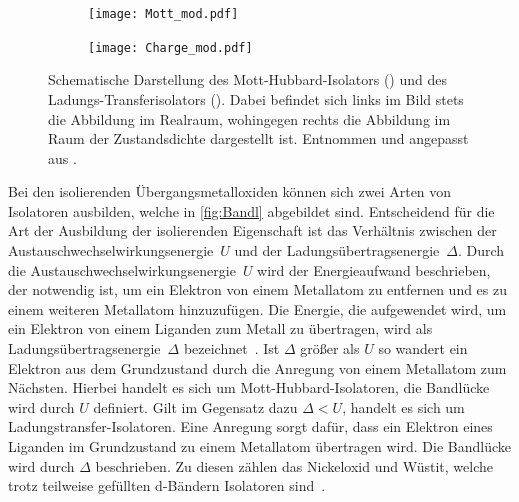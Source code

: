         \begin{figure}
            \centering
            \begin{subfigure}{0.48\textwidth}
                \centering
                \texttt{[image: Mott\_mod.pdf]}
                \subcaption{}
                \label{fig:Mott}
            \end{subfigure}
            \begin{subfigure}{0.48\textwidth}
                \centering
                \texttt{[image: Charge\_mod.pdf]}
                \subcaption{}
                \label{fig:Charge}
            \end{subfigure}
            \caption{Schematische Darstellung des Mott-Hubbard-Isolators () und des Ladungs-Transferisolators ().
            Dabei befindet sich links im Bild stets die Abbildung im Realraum, wohingegen rechts die Abbildung im Raum der Zustandsdichte dargestellt ist.
            Entnommen und angepasst aus \cite{stohr_magnetism_2006}.}
            \label{fig:Bandl}
        \end{figure}
        Bei den isolierenden Übergangsmetalloxiden können sich zwei Arten von Isolatoren ausbilden, welche in \autoref{fig:Bandl} abgebildet sind.
        Entscheidend für die Art der Ausbildung der isolierenden Eigenschaft ist das Verhältnis zwischen der Austauschwechselwirkungsenergie~$U$ und der Ladungsübertragsenergie~$\Delta$.
        Durch die Austauschwechselwirkungsenergie~$U$ wird der Energieaufwand beschrieben, der notwendig ist, um ein Elektron von einem Metallatom zu entfernen und es zu einem weiteren Metallatom hinzuzufügen.
        Die Energie, die aufgewendet wird, um ein Elektron von einem Liganden zum Metall zu übertragen, wird als Ladungsübertragsenergie~$\Delta$ bezeichnet~\cite{stohr_magnetism_2006}.
        Ist $\Delta$ größer als $U$ so wandert ein Elektron aus dem Grundzustand durch die Anregung von einem Metallatom zum Nächsten.
        Hierbei handelt es sich um Mott-Hubbard-Isolatoren, die Bandlücke wird durch $U$ definiert.
        Gilt im Gegensatz dazu $\Delta < U$, handelt es sich um Ladungstransfer-Isolatoren.
        Eine Anregung sorgt dafür, dass ein Elektron eines Liganden im Grundzustand zu einem Metallatom übertragen wird.
        Die Bandlücke wird durch $\Delta$ beschrieben.
        Zu diesen zählen das Nickeloxid und Wüstit, welche trotz teilweise gefüllten d-Bändern Isolatoren sind~\cite{IF_5}.


